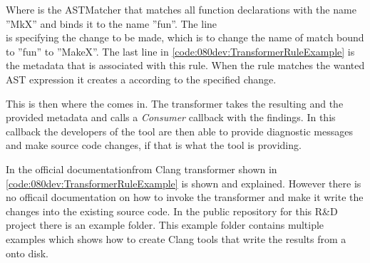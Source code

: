 Where  is the ASTMatcher that matches all function declarations with the name ''MkX'' and binds it to the name ''fun''. The line \\ is specifying the change to be made, which is to change the name of match bound to ''fun'' to ''MakeX''. The last line in \cref{code:080dev:TransformerRuleExample} is the metadata that is associated with this rule. When the rule matches the wanted AST expression it creates a  according to the specified change. 

This is then where the  comes in. The transformer takes the resulting  and the provided metadata and calls a \textit{Consumer} callback with the findings. In this callback the developers of the tool are then able to provide diagnostic messages and make source code changes, if that is what the tool is providing.\cite{ClangTransformerTutorial}

In the official documentationfrom Clang transformer shown in \cref{code:080dev:TransformerRuleExample} is shown and explained. However there is no officail documentation on how to invoke the transformer and make it write the changes into the existing source code. In the public repository for this R\&D project there is an example folder. This example folder contains multiple examples which shows how to create Clang tools that write the results from a  onto disk. \cite{kristensenMortenhaahrRD2023}

